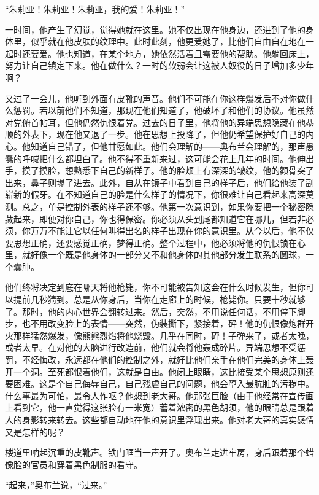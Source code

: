 ``朱莉亚！朱莉亚！朱莉亚，我的爱！朱莉亚！''

一时间，他产生了幻觉，觉得她就在这里。她不仅出现在他身边，还进到了他的身体里，似乎就在他皮肤的纹理中。此时此刻，他更爱她了，比他们自由自在地在一起时还要爱。他也知道，在某个地方，她依然活着且需要他的帮助。他躺回床上，努力让自己镇定下来。他在做什么？一时的软弱会让这被人奴役的日子增加多少年啊？

又过了一会儿，他听到外面有皮靴的声音。他们不可能在你这样爆发后不对你做什么惩罚。若以前他们不知道，那现在他们知道了，他破坏了和他们的协议。他虽然对党俯首帖耳，但他仍然仇恨着党。过去的日子里，他将他的异端思想隐藏在他恭顺的外表下，现在他又退了一步。他在思想上投降了，但他仍希望保护好自己的内心。他知道自己错了，但他甘愿如此。他们会理解的------奥布兰会理解的，那声愚蠢的呼喊把什么都坦白了。他不得不重新来过，这可能会花上几年的时间。他伸出手，摸了摸脸，想熟悉下自己的新样子。他的脸颊上有深深的皱纹，他的颧骨突了出来，鼻子则塌了进去。此外，自从在镜子中看到自己的样子后，他们给他装了副崭新的假牙。在不知道自己的脸是什么样子的情况下，你很难让自己看起来高深莫测。总之，单是控制外表的样子还不够。他第一次意识到，如果你要把一个秘密隐藏起来，即便对你自己，你也得保密。你必须从头到尾都知道它在哪儿，但若非必须，你万万不能让它以任何叫得出名的样子出现在你的意识里。从今以后，他不仅要思想正确，还要感觉正确，梦得正确。整个过程中，他必须将他的仇恨锁在心里，就好像一个既是他身体的一部分又不和他身体的其他部分发生联系的圆球，一个囊肿。

他们终将决定到底在哪天将他枪毙，你不可能被告知这会在什么时候发生，但你可以提前几秒猜到。总是从你身后，当你在走廊上的时候，枪毙你。只要十秒就够了。那时，他的内心世界会翻转过来。然后，突然，不用说任何话，不用停下脚步，也不用改变脸上的表情------突然，伪装撕下，紧接着，砰！他的仇恨像炮群开火那样猛然爆发，像熊熊烈焰将他烧毁。几乎在同时，砰！子弹来了，或者太晚，或者太早。在对他的大脑进行改造前，他们就会将他轰成碎片。异端思想不受惩罚，不经悔改，永远都在他们的控制之外，就好比他们亲手在他们完美的身体上轰开一个洞。至死都恨着他们，这就是自由。他闭上眼睛，这比接受某个思想原则还要困难。这是个自己侮辱自己，自己残虐自己的问题，他会堕入最肮脏的污秽中。什么事最为可怕，最令人作呕？他想到老大哥。他那张巨脸（由于他经常在宣传画上看到它，他一直觉得这张脸有一米宽）蓄着浓密的黑色胡须，他的眼睛总是跟着人的身影转来转去。这些都自动地在他的意识里浮现出来。他对老大哥的真实感情又是怎样的呢？

楼道里响起沉重的皮靴声。铁门哐当一声开了。奥布兰走进牢房，身后跟着那个蜡像脸的官员和穿着黑色制服的看守。

``起来，''奥布兰说，``过来。''

